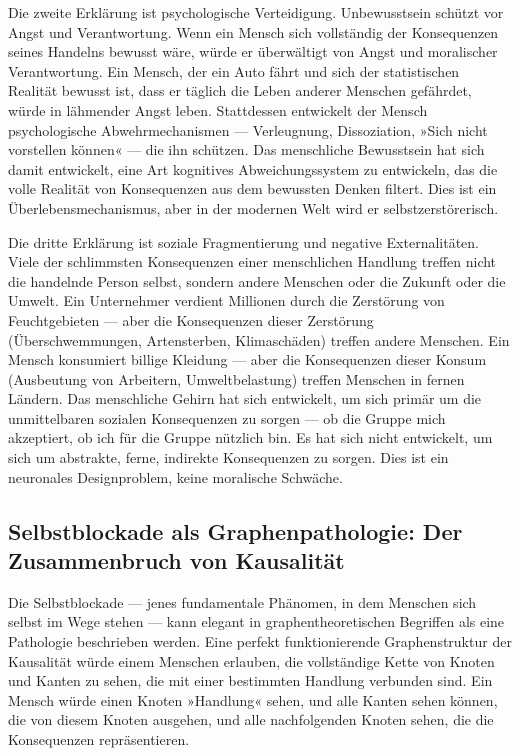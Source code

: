\documentclass[12pt,a4paper]{article}
\begin{document}
Die zweite Erklärung ist psychologische Verteidigung. Unbewusstsein schützt vor Angst und Verantwortung. Wenn ein Mensch sich vollständig der Konsequenzen seines Handelns bewusst wäre, würde er überwältigt von Angst und moralischer Verantwortung. Ein Mensch, der ein Auto fährt und sich der statistischen Realität bewusst ist, dass er täglich die Leben anderer Menschen gefährdet, würde in lähmender Angst leben. Stattdessen entwickelt der Mensch psychologische Abwehrmechanismen — Verleugnung, Dissoziation, »Sich nicht vorstellen können« — die ihn schützen. Das menschliche Bewusstsein hat sich damit entwickelt, eine Art kognitives Abweichungssystem zu entwickeln, das die volle Realität von Konsequenzen aus dem bewussten Denken filtert. Dies ist ein Überlebensmechanismus, aber in der modernen Welt wird er selbstzerstörerisch.

Die dritte Erklärung ist soziale Fragmentierung und negative Externalitäten. Viele der schlimmsten Konsequenzen einer menschlichen Handlung treffen nicht die handelnde Person selbst, sondern andere Menschen oder die Zukunft oder die Umwelt. Ein Unternehmer verdient Millionen durch die Zerstörung von Feuchtgebieten — aber die Konsequenzen dieser Zerstörung (Überschwemmungen, Artensterben, Klimaschäden) treffen andere Menschen. Ein Mensch konsumiert billige Kleidung — aber die Konsequenzen dieser Konsum (Ausbeutung von Arbeitern, Umweltbelastung) treffen Menschen in fernen Ländern. Das menschliche Gehirn hat sich entwickelt, um sich primär um die unmittelbaren sozialen Konsequenzen zu sorgen — ob die Gruppe mich akzeptiert, ob ich für die Gruppe nützlich bin. Es hat sich nicht entwickelt, um sich um abstrakte, ferne, indirekte Konsequenzen zu sorgen. Dies ist ein neuronales Designproblem, keine moralische Schwäche.

\subsection{Selbstblockade als Graphenpathologie: Der Zusammenbruch von Kausalität}

Die Selbstblockade — jenes fundamentale Phänomen, in dem Menschen sich selbst im Wege stehen — kann elegant in graphentheoretischen Begriffen als eine Pathologie beschrieben werden. Eine perfekt funktionierende Graphenstruktur der Kausalität würde einem Menschen erlauben, die vollständige Kette von Knoten und Kanten zu sehen, die mit einer bestimmten Handlung verbunden sind. Ein Mensch würde einen Knoten »Handlung« sehen, und alle Kanten sehen können, die von diesem Knoten ausgehen, und alle nachfolgenden Knoten sehen, die die Konsequenzen repräsentieren.
\end{document}
